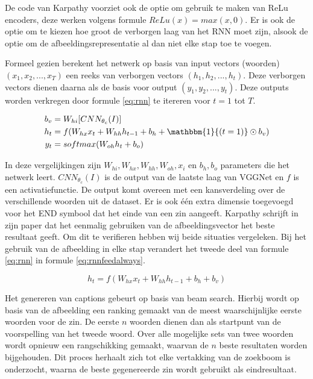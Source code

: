 De code van Karpathy voorziet ook de optie om gebruik te maken van ReLu encoders, deze werken volgens formule $ReLu(x) = max(x,0)$. Er is ook de optie om te kiezen hoe groot de verborgen laag van het RNN moet zijn, alsook de optie om de afbeeldingsrepresentatie al dan niet elke stap toe te voegen.

Formeel gezien berekent het netwerk op basis van input vectors (woorden) $(x_1,x_2,...,x_T)$ een reeks van verborgen vectors $(h_1,h_2,...,h_t)$. Deze verborgen vectors dienen daarna als de basis voor output $(y_1,y_2,...,y_t)$. Deze outputs worden verkregen door formule \eqref{eq:rnn} te itereren voor $t = 1$ tot $T$.

\begin{equation}
\begin{aligned}
     b_v &= W_{hi} [CNN_{\theta_c}(I)] \\
     h_t &= f(W_{hx} x_{t} + W_{hh} h_{t-1} + b_h + \mathbbm{1}{(t=1)} \odot b_v) \\
     y_t &= softmax( W_{oh} h_t + b_o)
\end{aligned}
\label{eq:rnn}
\end{equation}

In deze vergelijkingen zijn $W_{hi}, W_{hx}, W_{hh}, W_{oh}, x_i$ en $b_h, b_o$ parameters die het netwerk leert. $CNN_{\theta_c}(I)$ is de output van de laatste laag van VGGNet en $f$ is een activatiefunctie. De output komt overeen met een kansverdeling over de verschillende woorden uit de dataset. Er is ook \'e\'en extra dimensie toegevoegd voor het END symbool dat het einde van een zin aangeeft. Karpathy schrijft in zijn paper dat het eenmalig gebruiken van de afbeeldingsvector het beste resultaat geeft. Om dit te verifieren hebben wij beide situaties vergeleken. Bij het gebruik van de afbeelding in elke stap verandert het tweede deel van formule \eqref{eq:rnn} in formule \eqref{eq:rnnfeedalways}.

\begin{equation}
     h_t = f(W_{hx} x_{t} + W_{hh} h_{t-1} + b_h + b_v)
\label{eq:rnnfeedalways}
\end{equation}

Het genereren van captions gebeurt op basis van beam search. Hierbij wordt op basis van de afbeelding een ranking gemaakt van de meest waarschijnlijke eerste woorden voor de zin. De eerste $n$ woorden dienen dan als startpunt van de voorspelling van het tweede woord. Over alle mogelijke sets van twee woorden wordt opnieuw een rangschikking gemaakt, waarvan de $n$ beste resultaten worden bijgehouden. Dit proces herhaalt zich tot elke vertakking van de zoekboom is onderzocht, waarna de beste gegenereerde zin wordt gebruikt als eindresultaat.

